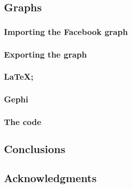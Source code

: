 \documentclass{sig-alternate-05-2015}
\begin{document}
\subsection{Graphs}
\subsubsection{Importing the Facebook graph}
\subsubsection{Exporting the graph}
\subsubsection{\LaTeX;}
\subsubsection{Gephi}
\subsubsection{The code}
\subsection{Conclusions}
\subsection{Acknowledgments}
\end{document}
